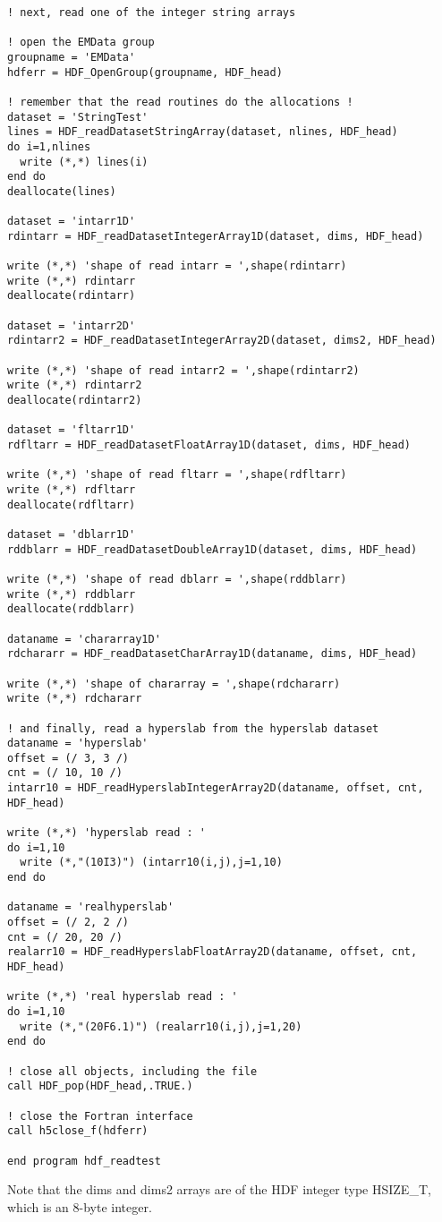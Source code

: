 \documentclass[DIV=calc, paper=letter, fontsize=11pt]{scrartcl}	 %
\begin{document}
{\begin{verbatim}
! next, read one of the integer string arrays

! open the EMData group
groupname = 'EMData'
hdferr = HDF_OpenGroup(groupname, HDF_head)

! remember that the read routines do the allocations !
dataset = 'StringTest'
lines = HDF_readDatasetStringArray(dataset, nlines, HDF_head)
do i=1,nlines
  write (*,*) lines(i)
end do
deallocate(lines)

dataset = 'intarr1D'
rdintarr = HDF_readDatasetIntegerArray1D(dataset, dims, HDF_head)

write (*,*) 'shape of read intarr = ',shape(rdintarr)
write (*,*) rdintarr
deallocate(rdintarr)

dataset = 'intarr2D'
rdintarr2 = HDF_readDatasetIntegerArray2D(dataset, dims2, HDF_head)

write (*,*) 'shape of read intarr2 = ',shape(rdintarr2)
write (*,*) rdintarr2
deallocate(rdintarr2)

dataset = 'fltarr1D'
rdfltarr = HDF_readDatasetFloatArray1D(dataset, dims, HDF_head)

write (*,*) 'shape of read fltarr = ',shape(rdfltarr)
write (*,*) rdfltarr
deallocate(rdfltarr)

dataset = 'dblarr1D'
rddblarr = HDF_readDatasetDoubleArray1D(dataset, dims, HDF_head)

write (*,*) 'shape of read dblarr = ',shape(rddblarr)
write (*,*) rddblarr
deallocate(rddblarr)

dataname = 'chararray1D'
rdchararr = HDF_readDatasetCharArray1D(dataname, dims, HDF_head)

write (*,*) 'shape of chararray = ',shape(rdchararr)
write (*,*) rdchararr

! and finally, read a hyperslab from the hyperslab dataset
dataname = 'hyperslab'
offset = (/ 3, 3 /)
cnt = (/ 10, 10 /)
intarr10 = HDF_readHyperslabIntegerArray2D(dataname, offset, cnt, HDF_head)

write (*,*) 'hyperslab read : '
do i=1,10
  write (*,"(10I3)") (intarr10(i,j),j=1,10)
end do

dataname = 'realhyperslab'
offset = (/ 2, 2 /)
cnt = (/ 20, 20 /)
realarr10 = HDF_readHyperslabFloatArray2D(dataname, offset, cnt, HDF_head)

write (*,*) 'real hyperslab read : '
do i=1,10
  write (*,"(20F6.1)") (realarr10(i,j),j=1,20)
end do

! close all objects, including the file
call HDF_pop(HDF_head,.TRUE.)

! close the Fortran interface
call h5close_f(hdferr)

end program hdf_readtest
\end{verbatim}}
Note that the \textsf{dims} and \textsf{dims2} arrays are of the HDF integer type \textsf{HSIZE\_T}, which
is an 8-byte integer.
\end{document}

